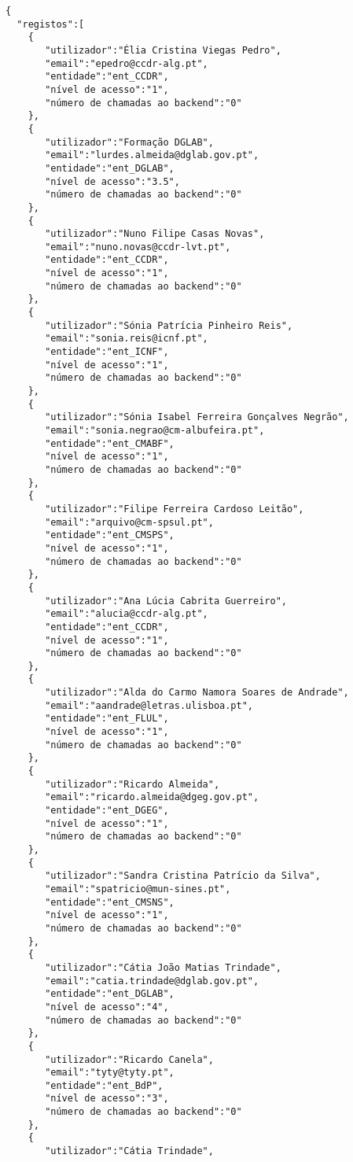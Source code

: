 \documentclass[11pt,a4paper]{report}%
\begin{document}
\begin{verbatim}
{
  "registos":[
    {
       "utilizador":"Élia Cristina Viegas Pedro",
       "email":"epedro@ccdr-alg.pt",
       "entidade":"ent_CCDR",
       "nível de acesso":"1",
       "número de chamadas ao backend":"0"
    },
    {
       "utilizador":"Formação DGLAB",
       "email":"lurdes.almeida@dglab.gov.pt",
       "entidade":"ent_DGLAB",
       "nível de acesso":"3.5",
       "número de chamadas ao backend":"0"
    },
    {
       "utilizador":"Nuno Filipe Casas Novas",
       "email":"nuno.novas@ccdr-lvt.pt",
       "entidade":"ent_CCDR",
       "nível de acesso":"1",
       "número de chamadas ao backend":"0"
    },
    {
       "utilizador":"Sónia Patrícia Pinheiro Reis",
       "email":"sonia.reis@icnf.pt",
       "entidade":"ent_ICNF",
       "nível de acesso":"1",
       "número de chamadas ao backend":"0"
    },
    {
       "utilizador":"Sónia Isabel Ferreira Gonçalves Negrão",
       "email":"sonia.negrao@cm-albufeira.pt",
       "entidade":"ent_CMABF",
       "nível de acesso":"1",
       "número de chamadas ao backend":"0"
    },
    {
       "utilizador":"Filipe Ferreira Cardoso Leitão",
       "email":"arquivo@cm-spsul.pt",
       "entidade":"ent_CMSPS",
       "nível de acesso":"1",
       "número de chamadas ao backend":"0"
    },
    {
       "utilizador":"Ana Lúcia Cabrita Guerreiro",
       "email":"alucia@ccdr-alg.pt",
       "entidade":"ent_CCDR",
       "nível de acesso":"1",
       "número de chamadas ao backend":"0"
    },
    {
       "utilizador":"Alda do Carmo Namora Soares de Andrade",
       "email":"aandrade@letras.ulisboa.pt",
       "entidade":"ent_FLUL",
       "nível de acesso":"1",
       "número de chamadas ao backend":"0"
    },
    {
       "utilizador":"Ricardo Almeida",
       "email":"ricardo.almeida@dgeg.gov.pt",
       "entidade":"ent_DGEG",
       "nível de acesso":"1",
       "número de chamadas ao backend":"0"
    },
    {
       "utilizador":"Sandra Cristina Patrício da Silva",
       "email":"spatricio@mun-sines.pt",
       "entidade":"ent_CMSNS",
       "nível de acesso":"1",
       "número de chamadas ao backend":"0"
    },
    {
       "utilizador":"Cátia João Matias Trindade",
       "email":"catia.trindade@dglab.gov.pt",
       "entidade":"ent_DGLAB",
       "nível de acesso":"4",
       "número de chamadas ao backend":"0"
    },
    {
       "utilizador":"Ricardo Canela",
       "email":"tyty@tyty.pt",
       "entidade":"ent_BdP",
       "nível de acesso":"3",
       "número de chamadas ao backend":"0"
    },
    {
       "utilizador":"Cátia Trindade",

\end{verbatim}
\end{document}
